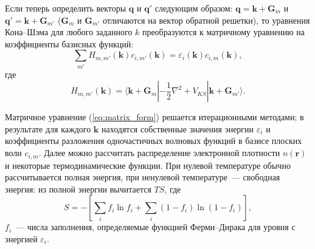 Если теперь определить векторы $\mathbf{q}$ и $\mathbf{q}'$ следующим образом: $\mathbf{q} = \mathbf{k} + \mathbf{G}_m$ и $\mathbf{q}' = \mathbf{k} + \mathbf{G}_{m'}$ ($\mathbf{G}_m$ и $\mathbf{G}_{m'}$ отличаются на вектор обратной решетки), то уравнения Кона--Шэма для любого заданного $k$ преобразуются к матричному уравнению на коэффициенты базисных функций:
\begin{equation}
    \sum_{m'} H_{m,m'}(\mathbf{k}) c_{i,m'}(\mathbf{k}) = \varepsilon_i(\mathbf{k})c_{i,m}(\mathbf{k}),
    \label{eq:matrix_form}
\end{equation}
%
где
%
\begin{equation}
    H_{m,m'}(\mathbf{k}) = \langle\mathbf{k} + \mathbf{G}_m|-\frac{1}{2}\nabla^2 + V_{KS}|
        \mathbf{k} + \mathbf{G}_{m'}\rangle.
    \label{eq:matrix_form}
\end{equation}
%

Матричное уравнение (\ref{eq:matrix_form}) решается итерационными методами; в результате для каждого $\mathbf{k}$ находятся собственные значения энергии $\varepsilon_i$ и коэффициенты разложения одночастичных волновых функций в базисе плоских волн $c_{i,m}$. Далее можно рассчитать распределение электронной плотности $n(\mathbf{r})$ и некоторые термодинамические функции. При нулевой температуре обычно рассчитывается полная энергия, при ненулевой температуре~--- свободная энергия: из полной энергии вычитается $TS$, где 
%
\begin{equation}
    S = -\left[
        \sum_{i} f_i \ln f_i + \sum_{i}(1 - f_i)\ln(1 - f_i)
    \right],
\end{equation}
%
$f_i$~--- числа заполнения, определяемые функцией Ферми--Дирака для уровня с энергией $\varepsilon_i$.

%

